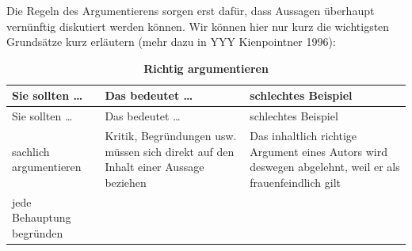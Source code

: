 \documentclass[]{book}
\theoremstyle{definition}
\theoremstyle{definition}
\theoremstyle{definition}
\theoremstyle{remark}
\begin{document}
Die Regeln des Argumentierens sorgen erst dafür, dass Aussagen überhaupt
vernünftig diskutiert werden können. Wir können hier nur kurz die
wichtigsten Grundsätze kurz erläutern (mehr dazu in YYY Kienpointner
1996):

\begin{longtable}[]{@{}lll@{}}
\caption{\textbf{\label{tab:argumente2} Richtig
argumentieren}}\tabularnewline
\toprule
\begin{minipage}[b]{0.19\columnwidth}\raggedright\strut
Sie sollten \ldots{}\strut
\end{minipage} & \begin{minipage}[b]{0.39\columnwidth}\raggedright\strut
Das bedeutet \ldots{}\strut
\end{minipage} & \begin{minipage}[b]{0.33\columnwidth}\raggedright\strut
schlechtes Beispiel\strut
\end{minipage}\tabularnewline
\midrule
\endfirsthead
\toprule
\begin{minipage}[b]{0.19\columnwidth}\raggedright\strut
Sie sollten \ldots{}\strut
\end{minipage} & \begin{minipage}[b]{0.39\columnwidth}\raggedright\strut
Das bedeutet \ldots{}\strut
\end{minipage} & \begin{minipage}[b]{0.33\columnwidth}\raggedright\strut
schlechtes Beispiel\strut
\end{minipage}\tabularnewline
\midrule
\endhead
\begin{minipage}[t]{0.19\columnwidth}\raggedright\strut
sachlich argumentieren\strut
\end{minipage} & \begin{minipage}[t]{0.39\columnwidth}\raggedright\strut
Kritik, Begründungen usw. müssen sich direkt auf den Inhalt einer
Aussage beziehen\strut
\end{minipage} & \begin{minipage}[t]{0.33\columnwidth}\raggedright\strut
Das inhaltlich richtige Argument eines Autors wird deswegen abgelehnt,
weil er als frauenfeindlich gilt \vspace{-6mm}\strut
\end{minipage}\tabularnewline
\begin{minipage}[t]{0.19\columnwidth}\raggedright\strut
jede Behauptung begründen\strut
\end{minipage} & \begin{minipage}[t]{0.39\columnwidth}\raggedright\strut

\end{minipage}
\end{longtable}
\end{document}
